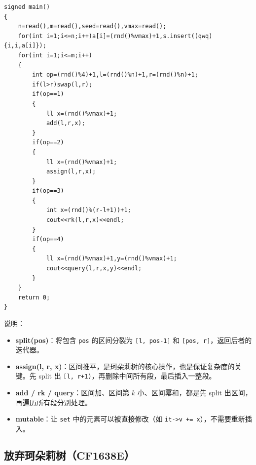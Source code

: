 \begin{verbatim}
signed main()
{
    n=read(),m=read(),seed=read(),vmax=read();
    for(int i=1;i<=n;i++)a[i]=(rnd()%vmax)+1,s.insert((qwq){i,i,a[i]});
    for(int i=1;i<=m;i++)
    {
        int op=(rnd()%4)+1,l=(rnd()%n)+1,r=(rnd()%n)+1;
        if(l>r)swap(l,r);
        if(op==1)
        {
            ll x=(rnd()%vmax)+1;
            add(l,r,x); 
        }
        if(op==2)
        {
            ll x=(rnd()%vmax)+1;
            assign(l,r,x);
        }
        if(op==3)
        {
            int x=(rnd()%(r-l+1))+1;
            cout<<rk(l,r,x)<<endl;
        }
        if(op==4)
        {
            ll x=(rnd()%vmax)+1,y=(rnd()%vmax)+1;
            cout<<query(l,r,x,y)<<endl;
        }
    }
    return 0;
}
\end{verbatim}

\par \noindent 说明：
\begin{itemize}
\item \textbf{split(pos)}：将包含 \texttt{pos} 的区间分裂为 \texttt{[l, pos-1]} 和 \texttt{[pos, r]}，返回后者的迭代器。
\item \textbf{assign(l, r, x)}：区间推平，是珂朵莉树的核心操作，也是保证复杂度的关键。先 split 出 \texttt{[l, r+1)}，再删除中间所有段，最后插入一整段。
\item \textbf{add / rk / query}：区间加、区间第 $k$ 小、区间幂和，都是先 split 出区间，再遍历所有段分别处理。
\item \textbf{mutable}：让 \texttt{set} 中的元素可以被直接修改（如 \texttt{it->v += x}），不需要重新插入。
\end{itemize}

\subsection{放弃珂朵莉树（CF1638E）}


